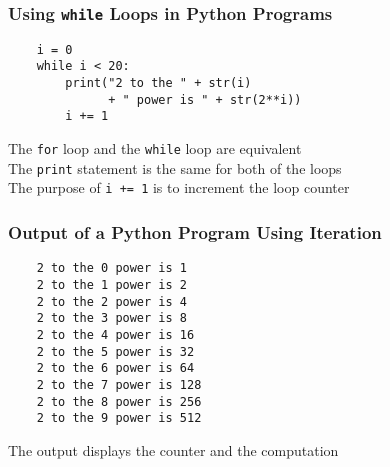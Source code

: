 \documentclass[14pt,aspectratio=169]{beamer}
\begin{document}
%
\begin{frame}[fragile]
  \frametitle{Using {\tt while} Loops in Python Programs}
  \normalsize
  \hspace*{-.65in}
  \begin{minipage}{6in}
    \vspace*{.25in}
    \begin{verbatim}
    i = 0
    while i < 20:
        print("2 to the " + str(i)
              + " power is " + str(2**i))
        i += 1
    \end{verbatim}
  \end{minipage}
  \vspace*{.1in}
  \begin{center}
    \normalsize \noindent The {\tt for} loop and the {\tt while} loop are equivalent\\
    \normalsize \noindent The {\tt print} statement is the same for both of the loops\\
    \normalsize \noindent The purpose of {\tt i += 1} is to increment the loop counter\\
  \end{center}
\end{frame}

%
\begin{frame}[fragile]
  \frametitle{Output of a Python Program Using Iteration}
  \normalsize
  \hspace*{-.35in}
  \begin{minipage}{6in}
    \vspace*{.25in}
    \begin{verbatim}
    2 to the 0 power is 1
    2 to the 1 power is 2
    2 to the 2 power is 4
    2 to the 3 power is 8
    2 to the 4 power is 16
    2 to the 5 power is 32
    2 to the 6 power is 64
    2 to the 7 power is 128
    2 to the 8 power is 256
    2 to the 9 power is 512
    \end{verbatim}
  \end{minipage}
  \vspace*{.05in}
  \begin{center}
    \normalsize \noindent The output displays the counter and the computation\\
  \end{center}
\end{frame}
\end{document}
